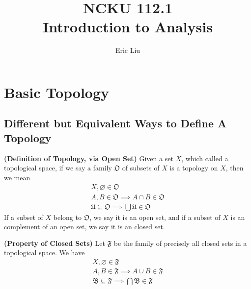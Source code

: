 \documentclass{report}
\title{\Huge{NCKU 112.1}\\Introduction to Analysis}
\author{\huge{Eric Liu}}
\date{}
\begin{document}
\maketitle
\newpage%
\tableofcontents
\pagebreak
\setcounter{chapter}{-1}
\chapter{Basic Topology} 
\section{Different but Equivalent Ways to Define A Topology}
\begin{definition}
\label{0.1.1}
\textbf{(Definition of Topology, via Open Set)} Given a set $X$, which called a topological space, if we say a family $\mathfrak{O}$  of subsets of $X$ is a topology on $X$, then we mean
\begin{gather}
X, \varnothing \in \mathfrak{O}\\
A,B\in\mathfrak{O}\implies A\cap B\in\mathfrak{O}\\
\mathfrak{U}\subseteq \mathfrak{O}\implies \bigcup \mathfrak{U}\in \mathfrak{O}
\end{gather}
If a subset of $X$ belong to  $\mathfrak{O}$, we say it is an open set, and if a subset of $X$ is an complement of an open set, we say it is an closed set.
\end{definition}
\begin{theorem}
\label{0.1.2}
\textbf{(Property of Closed Sets)} Let $\mathfrak{F}$ be the family of precisely all closed sets in a topological space. We have
\begin{gather}
X,\varnothing \in \mathfrak{F}\\
A,B\in\mathfrak{F}\implies A\cup  B\in\mathfrak{F}\\
\mathfrak{B}\subseteq \mathfrak{F}\implies \bigcap \mathfrak{B}\in \mathfrak{F}
\end{gather}
\end{theorem}
\end{document}
